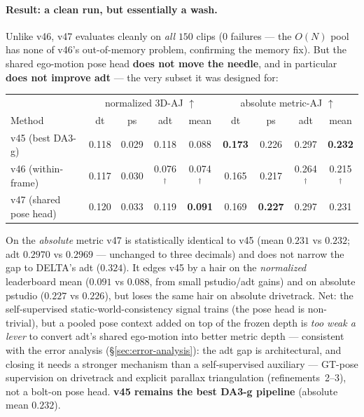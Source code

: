 \documentclass[11pt,a4paper]{article}
\begin{document}
\paragraph{Result: a clean run, but essentially a wash.}
Unlike v46, v47 evaluates cleanly on \emph{all} $150$ clips ($0$ failures --- the $O(N)$ pool has none of
v46's out-of-memory problem, confirming the memory fix). But the shared ego-motion pose head \textbf{does not
move the needle}, and in particular \textbf{does not improve adt} --- the very subset it was designed for:
\begin{center}\small
\begin{tabular}{lcccc|cccc}
\toprule
 & \multicolumn{4}{c|}{normalized 3D-AJ $\uparrow$} & \multicolumn{4}{c}{absolute metric-AJ $\uparrow$} \\
Method & dt & ps & adt & mean & dt & ps & adt & mean \\
\midrule
v45 (best DA3-g)        & 0.118 & 0.029 & 0.118 & 0.088 & \textbf{0.173} & 0.226 & 0.297 & \textbf{0.232} \\
v46 (within-frame)      & 0.117 & 0.030 & 0.076$^{\dagger}$ & 0.074$^{\dagger}$ & 0.165 & 0.217 & 0.264$^{\dagger}$ & 0.215$^{\dagger}$ \\
v47 (shared pose head)  & 0.120 & 0.033 & 0.119 & \textbf{0.091} & 0.169 & \textbf{0.227} & 0.297 & 0.231 \\
\bottomrule
\end{tabular}
\end{center}
On the \emph{absolute} metric v47 is statistically identical to v45 (mean $0.231$ vs $0.232$; adt $0.2970$
vs $0.2969$ --- unchanged to three decimals) and does not narrow the gap to DELTA's adt ($0.324$). It edges
v45 by a hair on the \emph{normalized} leaderboard mean ($0.091$ vs $0.088$, from small pstudio/adt gains)
and on absolute pstudio ($0.227$ vs $0.226$), but loses the same hair on absolute drivetrack. Net: the
self-supervised static-world-consistency signal trains (the pose head is non-trivial), but a pooled pose
context added on top of the frozen depth is \emph{too weak a lever} to convert adt's shared ego-motion into
better metric depth --- consistent with the error analysis (\S\ref{sec:error-analysis}): the adt gap is
architectural, and closing it needs a stronger mechanism than a self-supervised auxiliary --- GT-pose
supervision on drivetrack and explicit parallax triangulation (refinements~2--3), not a bolt-on pose head.
\textbf{v45 remains the best DA3-g pipeline} (absolute mean $0.232$).
\end{document}
